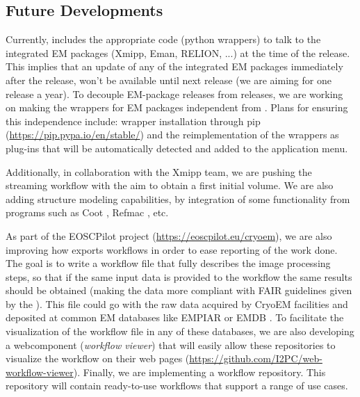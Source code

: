 \subsection{Future Developments}

Currently, \scipion includes the appropriate code (python wrappers) to talk to the integrated EM packages (Xmipp, Eman, RELION, ...) at the time of the release. This implies that an update of any of the integrated EM packages immediately after the \scipion release, won't be available until next \scipion release (we are aiming for one release a year). To decouple EM-package releases from \scipion releases, we are working on making the wrappers for EM packages  independent from \scipion. Plans for ensuring this independence include: wrapper installation through pip (\url{https://pip.pypa.io/en/stable/}) and the reimplementation of the wrappers as plug-ins that will be automatically detected and added to the application menu. 

Additionally, in collaboration with the Xmipp team, we are pushing the streaming workflow with the aim to obtain a first initial volume. We are also adding structure modeling capabilities, by integration of some functionality from programs such as Coot \citep{emsley2010:coot}, Refmac \citep{Murshudov1997:refmac}, etc. 

As part of the EOSCPilot project (\url{https://eoscpilot.eu/cryoem}), we are also improving  how \scipion exports workflows in order to ease reporting of the work done. The goal is to write a workflow file that fully describes the image processing steps, so that if the same input data is provided to the workflow the same results should be obtained (making the data more compliant with FAIR guidelines given by the \citet{eu2016:fair}). This file could go with the raw data acquired by CryoEM facilities and deposited at common EM databases like EMPIAR or EMDB \citep{Patwardhan2016:databasesEM}. To facilitate the visualization of the workflow file in any of these databases, we are also developing a  webcomponent (\scipion \emph{workflow viewer}) that will easily allow these repositories to visualize the workflow on their web pages (\url{https://github.com/I2PC/web-workflow-viewer}). Finally, we are implementing a workflow repository. This repository will contain ready-to-use workflows that support a range of use cases.
